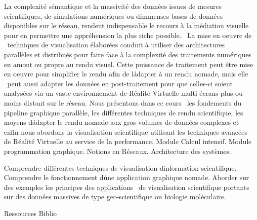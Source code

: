 {
La complexité sémantique et la massivité des données issues de mesures scientifiques, de simulations numériques ou
d\'immenses bases de données disponibles sur le réseau, rendent indispensable le recours à la médiation visuelle pour
en permettre une appréhension la plus riche possible.  La mise en oeuvre de  techniques de visualisation élaborées
conduit à utiliser des architectures parallèles et distribués pour faire face à la complexité des traitements numériques
en amont ou propre au rendu visuel. Cette puissance de traitement peut être mise en oeuvre pour simplifier le rendu
afin de l\'adapter à un rendu nomade, mais elle  peut aussi adapter les données en post-traitement pour que celles-ci
soient analysées via un vaste environnement de Réalité Virtuelle multi-écrans plus ou moins distant sur le réseau.
Nous présentons dans ce cours  les fondements du pipeline graphique parallèle, les différentes techniques de rendu
scientifique, les moyens d\'adapter le rendu nomade aux gros volumes de données complexes et enfin nous abordons
la visualisation scientifique utilisant les techniques avancées de Réalité Virtuelle au service de la performance.
} 
{Module Calcul intensif. Module programmation graphique. Notions en Réseaux. Architecture des systèmes.} 
{\begin{itemize}
\ObjItem Comprendre différentes techniques de visualisation d\'information scientifique.
\ObjItem Comprendre le fonctionnement d\'une application graphique nomade.
\ObjItem Aborder sur des exemples les principes des applications  de visualisation scientifique portants sur des données massives de type geo-scientifique ou biologie moléculaire.
\end{itemize} 
} 
{Ressources} 
{Biblio} 
 
